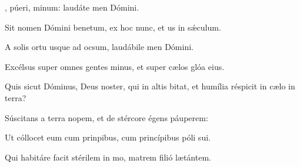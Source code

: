 \item {}, púeri, minum:\psstar{} laudáte men Dómini.

\item Sit nomen Dómini benetum,\psstar{} ex hoc nunc, et us in sǽculum.

\item A solis ortu usque ad ocsum,\psstar{} laudábile men Dómini.

\item Excélsus super omnes gentes minus,\psstar{} et super cælos glóa eius.

\item Quis sicut Dóminus, Deus noster, qui in altis bitat,\psstar{} et humília réspicit in cælo  in terra?

\item Súscitans a terra nopem,\psstar{} et de stércore égens páuperem:

\item Ut cóllocet eum cum prinpibus,\psstar{} cum princípibus póli sui.

\item Qui habitáre facit stérilem in mo,\psstar{} matrem filió lætántem.